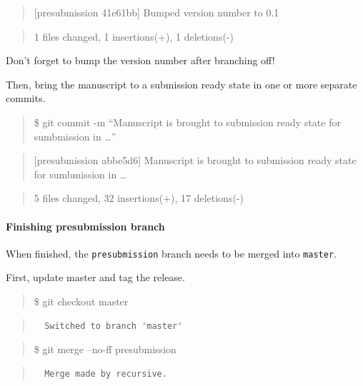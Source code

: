 \documentclass[]{book}
\let\oldparagraph\paragraph
\renewcommand{\paragraph}[1]{\oldparagraph{#1}\mbox{}}
\begin{document}
\begin{quote}
{[}presubmission 41e61bb{]} Bumped version number to 0.1
\end{quote}

\begin{quote}
1 files changed, 1 insertions(+), 1 deletions(-)
\end{quote}

Don't forget to bump the version number after branching off!

Then, bring the manuscript to a submission ready state in one or more
separate commits.

\begin{quote}
\$ git commit -m ``Manuscript is brought to submission ready state for
sumbmission in \ldots{}''
\end{quote}

\begin{quote}
{[}presubmission abbe5d6{]} Manuscript is brought to submission ready
state for sumbmission in \ldots{}
\end{quote}

\begin{quote}
5 files changed, 32 insertions(+), 17 deletions(-)
\end{quote}

\paragraph{Finishing presubmission
branch}\label{finishing-presubmission-branch}

When finished, the \texttt{presubmission} branch needs to be merged into
\texttt{master}.

First, update master and tag the release.

\begin{quote}
\$ git checkout master
\end{quote}

\begin{quote}
\begin{verbatim}
  Switched to branch 'master'
\end{verbatim}
\end{quote}

\begin{quote}
\$ git merge --no-ff presubmission
\end{quote}

\begin{quote}
\begin{verbatim}
  Merge made by recursive.
\end{verbatim}
\end{quote}
\end{document}
